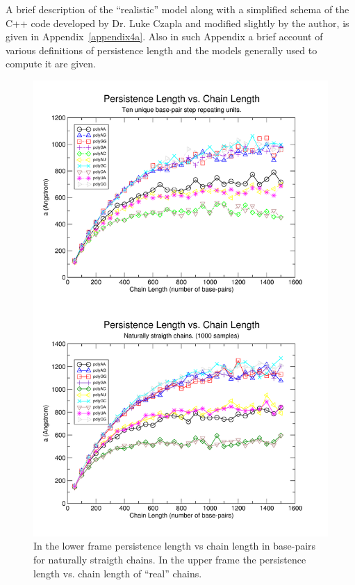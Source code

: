 A brief description of the ``realistic'' model along with a simplified
schema  of the  C++ code  developed by  Dr. Luke  Czapla  and modified
slightly by  the author, is given  in Appendix~\ref{appendix4a}.  Also
in such Appendix a brief account of various definitions of persistence
length and the models generally used to compute it are given.

\begin{figure}
\centering
\includegraphics[angle=0, scale=2.8]{Chapter4/perVlen.png}
\caption{In the lower frame persistence length vs chain length in
  base-pairs for naturally straigth chains. In the upper frame the
  persistence length vs. chain length of ``real'' chains.}
\label{fig:perVlen}
\end{figure}


